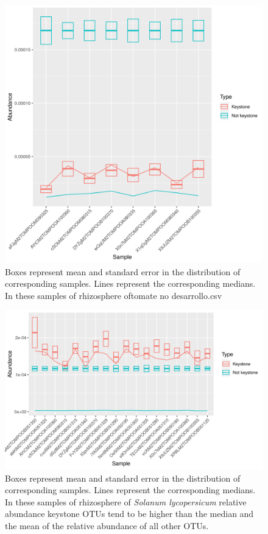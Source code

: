 \documentclass{article}
\begin{document}
\begin{figure}
 \centering
 \includegraphics[scale = 0.75]{mean_median_key_vs_not_key_tomate_no_desarrollo.csv.png}
\caption{Boxes represent mean and standard error in the distribution of corresponding samples. Lines represent the corresponding medians. In these samples of rhizosphere oftomate no desarrollo.csv}
\label{mean_median_tomate_no_desarrollo.csv}
\end{figure}

\begin{figure}
    \centering
    \includegraphics[scale = 0.75]{mean_median_key_vs_not_key_tomate.png}
    \caption{Boxes represent mean and standard error in the distribution of corresponding samples. Lines represent the corresponding medians. In these samples of rhizosphere of \textit{Solanum lycopersicum} relative abundance keystone OTUs tend to be higher than the median and the mean of the relative abundance of all other OTUs. }
    \label{mean_median_tomate}
\end{figure}
\end{document}
